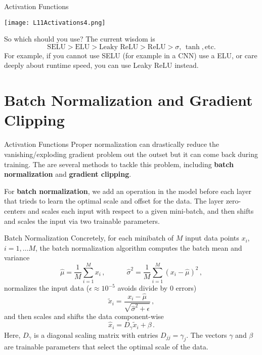 \documentclass[10pt, table, dvipsnames,xcdraw,handout]{beamer}
\begin{document}
\begin{frame}[fragile]{Activation Functions}
  \begin{minipage}[t][0.5\textheight][t]{\textwidth}
	\centering \texttt{[image: L11Activations4.png]} 
  \end{minipage}
  \vfill
\begin{minipage}[t][0.5\textheight][t]{\textwidth}
So which should you use? The current wisdom is 
$$
\text{SELU}>\text{ELU}>\text{Leaky ReLU}>\text{ReLU}>\sigma,\,\tanh, \text{etc.} 
$$
For example, if you cannot use SELU (for example in a CNN) use a ELU, or care deeply about runtime speed, you can use Leaky ReLU instead. 
\end{minipage}
\end{frame}


\section{Batch Normalization and Gradient Clipping}



\begin{frame}[fragile]{Activation Functions}
Proper normalization can drastically reduce the vanishing/exploding gradient problem out the outset but it can come back during training. The are several methods to tackle this problem, including \textbf{batch normalization} and \textbf{gradient clipping}. 

For \textbf{batch normalization}, we add an operation in the model before each layer that trieds to learn the optimal scale and offset for the data. The layer zero-centers and scales each input with respect to a given mini-batch, and then shifts and scales the input via two trainable parameters. 
\end{frame}



\begin{frame}[fragile]{Batch Normalization}
Concretely, for each minibatch of $M$ input data points $x_i$, $i=1,\ldots M$, the batch normalization algorithm computes the batch mean and variance
$$
\hat{\mu} = \frac{1}{M}\sum_{i=1}^M x_i\,,\hspace{3em} \hat{\sigma}^2 = \frac{1}{M}\sum_{i=1}^M (x_i - \hat{\mu})^2\,,
$$
normalizes the input data ($\epsilon \approx 10^{-5}$ avoids divide by 0 errors)
$$
\tilde{x}_i = \frac{x_i - \hat{\mu}}{\sqrt{\hat{\sigma}^2 + \epsilon}}\,,
$$
and then scales and shifts the data component-wise
$$
\hat{x}_i =  D_\gamma \tilde{x}_i + \beta\,.
$$
Here, $D_\gamma $ is a diagonal scaling matrix with entries $D_{jj} = \gamma_j$. The vectors $\gamma$ and $\beta$ are trainable parameters that select the optimal scale of the data. 
\end{frame}
\end{document}
